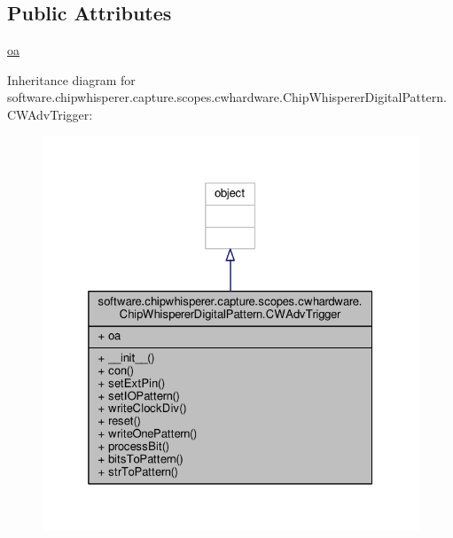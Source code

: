 \subsection*{Public Attributes}
\begin{DoxyCompactItemize}
\item 
\hyperlink{classsoftware_1_1chipwhisperer_1_1capture_1_1scopes_1_1cwhardware_1_1ChipWhispererDigitalPattern_1_1CWAdvTrigger_af26d1fad8d0ca052f1b915eb5de64c37}{oa}
\end{DoxyCompactItemize}


Inheritance diagram for software.\+chipwhisperer.\+capture.\+scopes.\+cwhardware.\+Chip\+Whisperer\+Digital\+Pattern.\+C\+W\+Adv\+Trigger\+:\nopagebreak
\begin{figure}[H]
\begin{center}
\leavevmode
\includegraphics[width=325pt]{df/d22/classsoftware_1_1chipwhisperer_1_1capture_1_1scopes_1_1cwhardware_1_1ChipWhispererDigitalPatterne7d47776e6820a0f18f62cfc9f174d16}
\end{center}
\end{figure}


